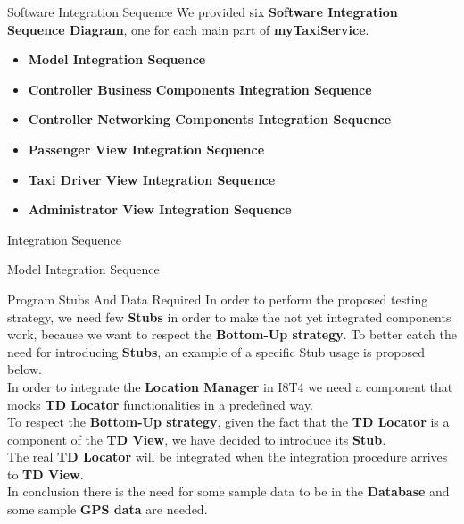 \documentclass{../common/latex_classes/pdf_presentation}
\begin{document}
	\begin{frame}{Software Integration Sequence}
		We provided six \textbf{Software Integration Sequence Diagram}, one for each main part of \textbf{myTaxiService}.
		\begin{itemize}
			\item \textbf{Model Integration Sequence}
			\item \textbf{Controller Business Components Integration Sequence}
			\item \textbf{Controller Networking Components Integration Sequence}
			\item \textbf{Passenger View Integration Sequence}
			\item \textbf{Taxi Driver View Integration Sequence}
			\item \textbf{Administrator View Integration Sequence}
		\end{itemize}
	\end{frame}
	\begin{frame}{Integration Sequence}
	\end{frame}
	\begin{frame}{Model Integration Sequence}
	\end{frame}
	\begin{frame}{Program Stubs And Data Required}
		In order to perform the proposed testing strategy, we need few \textbf{Stubs} in order to make the not yet integrated components work, because we want to respect the \textbf{Bottom-Up strategy}.
		\medskip
		To better catch the need for introducing \textbf{Stubs}, an example of a specific Stub usage is proposed below.\\
		In order to integrate the \textbf{Location Manager} in I8T4 we need a component that mocks \textbf{TD Locator} functionalities in a predefined way. \\
		To respect the \textbf{Bottom-Up strategy}, given the fact that the \textbf{TD Locator} is a component of the \textbf{TD View}, we have decided to introduce its \textbf{Stub}. \\
		The real \textbf{TD Locator} will be integrated when the integration procedure arrives to \textbf{TD View}.\\
		\medskip
		In conclusion there is the need for some sample data to be in the \textbf{Database} and some sample \textbf{GPS data} are needed.
	\end{frame}
\end{document}
